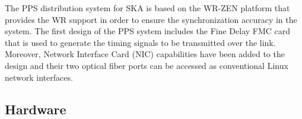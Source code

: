\documentclass[review]{elsarticle}
\begin{document}
The PPS distribution system for SKA is based on the WR-ZEN platform that provides the WR support in order to ensure the synchronization accuracy in the system. The first design of the PPS system includes the Fine Delay FMC card that is used to generate the timing signals to be transmitted over the link. Moreover, Network Interface Card (NIC) capabilities have been added to the design and their two optical fiber ports can be accessed as conventional Linux network interfaces.

\subsection{Hardware}

%
%
\end{document}
